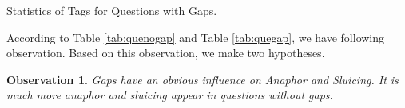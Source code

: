 \documentclass[bsc,frontabs,twoside,singlespacing,parskip,deptreport]{infthesis}     %
\newtheorem{observation}{Observation}[chapter]
\begin{document}
\begin{minipage}{\textwidth}
\begin{minipage}[t]{0.45\textwidth}
        \end{minipage}
        \begin{minipage}[t]{0.45\textwidth}
        \centering
        \makeatletter{}\makeatother



\caption{Statistics of Tags for Questions with Gaps.}
\label{tab:quegap}


        \end{minipage}
    \end{minipage}


According to Table \ref{tab:quenogap} and Table \ref{tab:quegap}, we have following observation. Based on this observation, we make two hypotheses. 

\begin{observation}
Gaps have an obvious influence on Anaphor and Sluicing. It is much more anaphor and sluicing appear in questions without gaps.
\end{observation}
\end{document}
